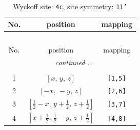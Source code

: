 \documentclass[fleqn,8pt]{jsarticle}
\begin{document}
\renewcommand{\arraystretch}{1.2}
\begin{longtable}{ccc}
\caption{Wyckoff site: {\tt 4c}, site symmetry: {\tt 11'}}
 \\
 \hline \hline
No. & position & mapping \\ \hline \endfirsthead

\multicolumn{2}{l}{\tablename\ \thetable{}} \\
 \hline \hline
No. & position & mapping \\ \hline \endhead

 \hline \hline
\multicolumn{2}{r}{\footnotesize\it continued ...} \\ \endfoot

 \hline \hline
\multicolumn{2}{r}{} \\ \endlastfoot

1 & $\left[ x,\, y,\, z \right]$ & {\tt [1,5]} \\ \hline
2 & $\left[ - x,\, - y,\, z \right]$ & {\tt [2,6]} \\ \hline
3 & $\left[ \frac{1}{2} - x,\, y + \frac{1}{2},\, z + \frac{1}{2} \right]$ & {\tt [3,7]} \\ \hline
4 & $\left[ x + \frac{1}{2},\, \frac{1}{2} - y,\, z + \frac{1}{2} \right]$ & {\tt [4,8]} \\
\end{longtable}
\end{document}
